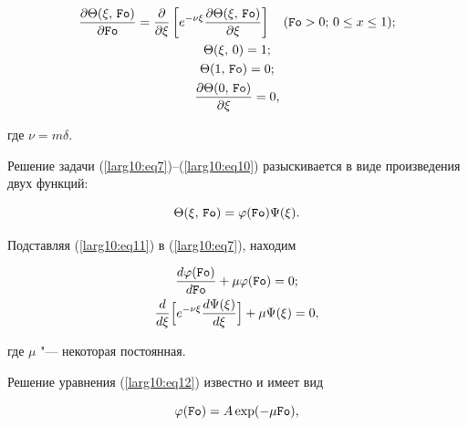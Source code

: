 \begin{gather}

\label{larg10:eq7}

\frac{\partial \Theta (\xi,\,{\tt Fo})}{\partial {\tt Fo}}=\frac{\partial }{\partial \xi

}\left[ e^{-\nu \xi }\frac{\partial \Theta (\xi,\,{\tt Fo})}{\partial \xi}\right]

\quad

({\tt Fo}>0; \, 0 \le x\le 1); \\

\label{larg10:eq8}

\Theta (\xi,\,0)=1;\\

\label{larg10:eq9}

\Theta (1,\,{\tt Fo})=0;\\

\label{larg10:eq10}

\frac{\partial \Theta (0,\,{\tt Fo})}{\partial \xi}=0,

\end{gather}

где $\nu = m \delta$.

Решение задачи (\ref{larg10:eq7})--(\ref{larg10:eq10}) разыскивается в виде произведения двух функций:

\begin{equation}

\label{larg10:eq11}

\Theta (\xi,\,{\tt Fo})=\varphi ({\tt Fo})\Psi (\xi ).

\end{equation}

Подставляя (\ref{larg10:eq11}) в (\ref{larg10:eq7}), находим

\begin{gather}

\label{larg10:eq12}

\frac{d\varphi ({\tt Fo})}{d{\tt Fo}} + \mu \varphi ({\tt Fo})=0;\\

\label{larg10:eq13}

\frac{d}{d\xi}\Bigl[ e^{-\nu \xi }\frac{d \Psi (\xi )}{d\xi} \Bigr]+\mu \Psi (\xi )=0,

\end{gather}

где $\mu $ "--- некоторая постоянная.

Решение уравнения (\ref{larg10:eq12}) известно и имеет вид

\begin{equation}

\label{larg10:eq14}

\varphi ({\tt Fo})=A \exp (-\mu {\tt Fo}),

\end{equation}

